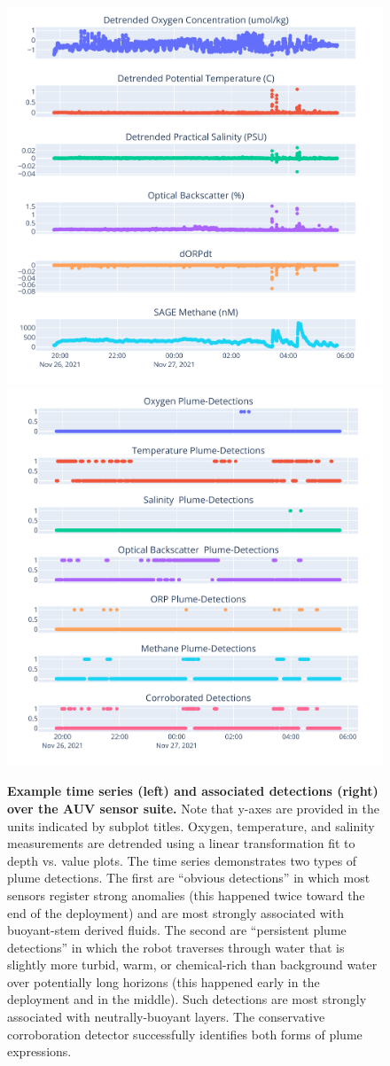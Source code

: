 \begin{figure}
    \centering
    \includegraphics[width=0.45\linewidth]{figures/binary_example_time.png}
    \hspace{.05in}
    \includegraphics[width=0.45\linewidth]{figures/binary_example_detections.png}
    \caption[Example time series (left) and associated detections (right) over the AUV \Sentry sensor suite.]{\textbf{Example time series (left) and associated detections (right) over the AUV \Sentry sensor suite.} Note that y-axes are provided in the units indicated by subplot titles. Oxygen, temperature, and salinity measurements are detrended using a linear transformation fit to depth vs. value plots. The time series demonstrates two types of plume detections. The first are ``obvious detections'' in which most sensors register strong anomalies (this happened twice toward the end of the deployment) and are most strongly associated with buoyant-stem derived fluids. The second are ``persistent plume detections'' in which the robot traverses through water that is slightly more turbid, warm, or chemical-rich than background water over potentially long horizons (this happened early in the deployment and in the middle). Such detections are most strongly associated with neutrally-buoyant layers. The conservative corroboration detector successfully identifies both forms of plume expressions.}
    \label{fig:detection_example}
\end{figure}


